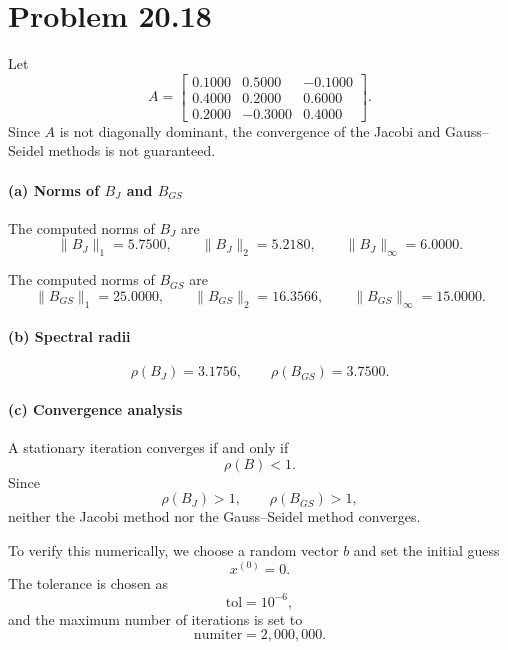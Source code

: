 \documentclass{ctexart}
\newif\ifpreface
\begin{document}
\large
\setlength{\baselineskip}{1.2em}
\ifpreface

\newgeometry{left=2cm,right=2cm,top=2cm,bottom=2cm}
\else
{}
\maketitle
\fi

\section{Problem 20.18}

Let
\[
  A=
  \begin{bmatrix}
    0.1000 & 0.5000 & -0.1000\\
    0.4000 & 0.2000 & 0.6000\\
    0.2000 & -0.3000 & 0.4000
  \end{bmatrix}.
\]
Since $A$ is not diagonally dominant, the convergence of the Jacobi and Gauss--Seidel methods is not guaranteed.

\paragraph{(a) Norms of $B_J$ and $B_{GS}$}

The computed norms of $B_J$ are
\[
  \|B_J\|_1 = 5.7500,\qquad
  \|B_J\|_2 = 5.2180,\qquad
  \|B_J\|_\infty = 6.0000.
\]

The computed norms of $B_{GS}$ are
\[
  \|B_{GS}\|_1 = 25.0000,\qquad
  \|B_{GS}\|_2 = 16.3566,\qquad
  \|B_{GS}\|_\infty = 15.0000.
\]

\paragraph{(b) Spectral radii}

\[
  \rho(B_J)=3.1756,\qquad
  \rho(B_{GS})=3.7500.
\]

\paragraph{(c) Convergence analysis}

A stationary iteration converges if and only if
\[
  \rho(B)<1.
\]
Since
\[
  \rho(B_J)>1,\qquad \rho(B_{GS})>1,
\]
neither the Jacobi method nor the Gauss--Seidel method converges.

To verify this numerically, we choose a random vector $b$ and set the initial guess
\[
  x^{(0)}=0.
\]
The tolerance is chosen as
\[
  \text{tol} = 10^{-6},
\]
and the maximum number of iterations is set to
\[
  \text{numiter} = 2{,}000{,}000.
\]
\end{document}
